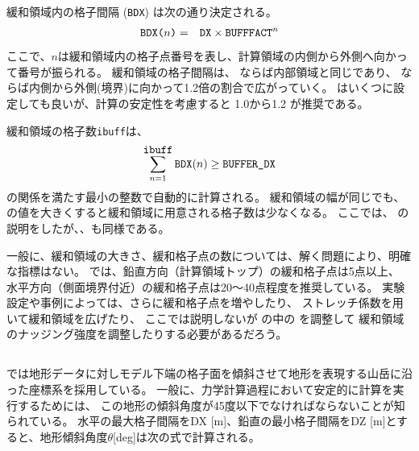 緩和領域内の格子間隔 (\verb|BDX|) は次の通り決定される。
\begin{eqnarray}
 \verb|BDX(|n\verb|)| &=& \verb|DX| \times \verb|BUFFFACT|^n \nonumber
\end{eqnarray}
ここで、$n$は緩和領域内の格子点番号を表し、計算領域の内側から外側へ向かって番号が振られる。
緩和領域の格子間隔は、
ならば内部領域と同じであり、
ならば内側から外側(境界)に向かって1.2倍の割合で広がっていく。
はいくつに設定しても良いが、計算の安定性を考慮すると 1.0から1.2 が推奨である。

緩和領域の格子数\verb|ibuff|は、
\begin{eqnarray}
\sum_{n=1}^{\verb|ibuff|} \verb|BDX|(n) \ge \verb|BUFFER_DX| \nonumber
\end{eqnarray}
の関係を満たす最小の整数で自動的に計算される。
%
緩和領域の幅が同じでも、
の値を大きくすると緩和領域に用意される格子数は少なくなる。
ここでは、{\XDIR} の説明をしたが、{\YDIR}、{\ZDIR}も同様である。



一般に、緩和領域の大きさ、緩和格子点の数については、解く問題により、明確な指標はない。
\scalerm では、鉛直方向（計算領域トップ）の緩和格子点は5点以上、
水平方向（側面境界付近）の緩和格子点は20〜40点程度を推奨している。
実験設定や事例によっては、さらに緩和格子点を増やしたり、
ストレッチ係数を用いて緩和領域を広げたり、
ここでは説明しないが
の中の
を調整して
緩和領域のナッジング強度を調整したりする必要があるだろう。




\subsection{\SecBasicTopoSetting} \label{subsec:basic_usel_topo}

\scalerm では地形データに対しモデル下端の格子面を傾斜させて地形を表現する山岳に沿った座標系を採用している。
一般に、力学計算過程において安定的に計算を実行するためには、
この地形の傾斜角度が45度以下でなければならないことが知られている。
水平の最大格子間隔をDX [m]、鉛直の最小格子間隔をDZ [m]とすると、地形傾斜角度$\theta$[deg]は次の式で計算される。


